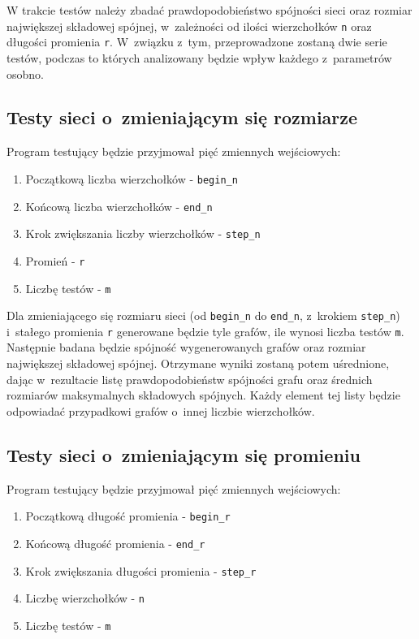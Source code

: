 		W trakcie testów należy zbadać prawdopodobieństwo spójności sieci oraz rozmiar największej składowej spójnej, w~zależności od ilości wierzchołków \texttt{n} oraz długości promienia \texttt{r}. W~związku z~tym, przeprowadzone zostaną dwie serie testów, podczas to których analizowany będzie wpływ każdego z~parametrów osobno.

		\subsection{Testy sieci o~zmieniającym się rozmiarze}
			\label{projekt:testy:rozmiar}

			\noindent Program testujący będzie przyjmował pięć zmiennych wejściowych:
			\begin{enumerate}
				\item Początkową liczba wierzchołków - \texttt{begin\_n}
				\item Końcową liczba wierzchołków - \texttt{end\_n}
				\item Krok zwiększania liczby wierzchołków - \texttt{step\_n}
				\item Promień - \texttt{r}
				\item Liczbę testów - \texttt{m}
			\end{enumerate}

			Dla zmieniającego się rozmiaru sieci (od \texttt{begin\_n} do \texttt{end\_n}, z~krokiem \texttt{step\_n}) i~stałego promienia \texttt{r} generowane będzie tyle grafów, ile wynosi liczba testów \texttt{m}. Następnie badana będzie spójność wygenerowanych grafów oraz rozmiar największej składowej spójnej. Otrzymane wyniki zostaną potem uśrednione, dając w~rezultacie listę prawdopodobieństw spójności grafu oraz średnich rozmiarów maksymalnych składowych spójnych. Każdy element tej listy będzie odpowiadać przypadkowi grafów o~innej liczbie wierzchołków.

		\subsection{Testy sieci o~zmieniającym się promieniu}
			\label{projekt:testy:promien}

			\noindent Program testujący będzie przyjmował pięć zmiennych wejściowych:
			\begin{enumerate}
				\item Początkową długość promienia - \texttt{begin\_r}
				\item Końcową długość promienia - \texttt{end\_r}
				\item Krok zwiększania długości promienia - \texttt{step\_r}
				\item Liczbę wierzchołków - \texttt{n}
				\item Liczbę testów - \texttt{m}
			\end{enumerate}

